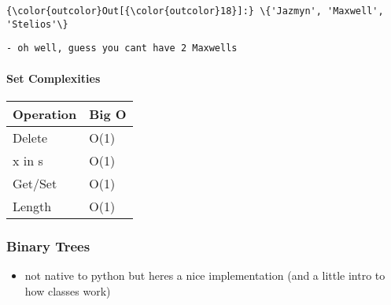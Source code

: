 \documentclass[11pt]{article}
\providecommand{\tightlist}{%
      \setlength{\itemsep}{0pt}\setlength{\parskip}{0pt}}
\begin{document}
\begin{Verbatim}[commandchars=\\\{\}]
{\color{outcolor}Out[{\color{outcolor}18}]:} \{'Jazmyn', 'Maxwell', 'Stelios'\}
\end{Verbatim}
            
    \begin{verbatim}
- oh well, guess you cant have 2 Maxwells
\end{verbatim}

    \paragraph{Set Complexities}\label{set-complexities}

\begin{longtable}[]{@{}ll@{}}
\toprule
Operation & Big O\tabularnewline
\midrule
\endhead
Delete & O(1)\tabularnewline
x in s & O(1)\tabularnewline
Get/Set & O(1)\tabularnewline
Length & O(1)\tabularnewline
\bottomrule
\end{longtable}

    \subsubsection{Binary Trees}\label{binary-trees}

\begin{itemize}
\tightlist
\item
  not native to python but heres a nice implementation (and a little
  intro to how classes work)
\end{itemize}
\end{document}
